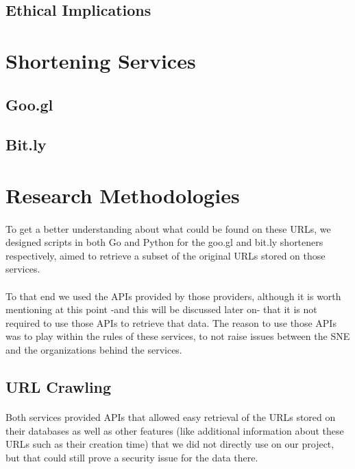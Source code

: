 \documentclass[12pt]{article}
\begin{document}
\subsection{Ethical Implications}

\section{Shortening Services}

\subsection{Goo.gl}

\subsection{Bit.ly}
	
\section{Research Methodologies}

\paragraph{}
To get a better understanding about what could be found on these URLs, we designed scripts in both Go and Python for the goo.gl and bit.ly shorteners respectively, aimed to retrieve a subset of the original URLs stored on those services.

\paragraph{}
To that end we used the APIs provided by those providers, although it is worth mentioning at this point -and this will be discussed later on- that it is not required to use those APIs to retrieve that data. The reason to use those APIs was to play within the rules of these services, to not raise issues between the SNE and the organizations behind the services.

\subsection{URL Crawling}

\paragraph{}
Both services provided APIs that allowed easy retrieval of the URLs stored on their databases as well as other features (like additional information about these URLs such as their creation time) that we did not directly use on our project, but that could still prove a security issue for the data there.
\end{document}
